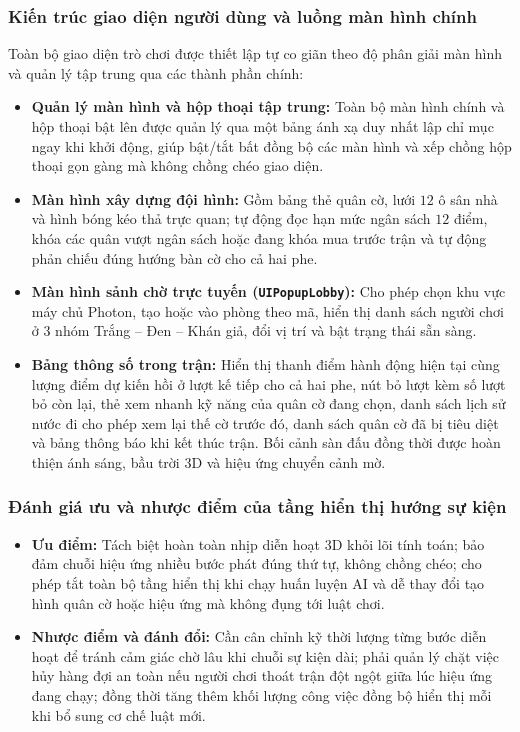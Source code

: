 \subsubsection{Kiến trúc giao diện người dùng và luồng màn hình chính}
Toàn bộ giao diện trò chơi được thiết lập tự co giãn theo độ phân giải màn hình và quản lý tập trung qua các thành phần chính:
\begin{itemize}
    \item \textbf{Quản lý màn hình và hộp thoại tập trung:} Toàn bộ màn hình chính và hộp thoại bật lên được quản lý qua một bảng ánh xạ duy nhất lập chỉ mục ngay khi khởi động, giúp bật/tắt bất đồng bộ các màn hình và xếp chồng hộp thoại gọn gàng mà không chồng chéo giao diện.
    \item \textbf{Màn hình xây dựng đội hình:} Gồm bảng thẻ quân cờ, lưới $12$ ô sân nhà và hình bóng kéo thả trực quan; tự động đọc hạn mức ngân sách $12$ điểm, khóa các quân vượt ngân sách hoặc đang khóa mua trước trận và tự động phản chiếu đúng hướng bàn cờ cho cả hai phe.
    \item \textbf{Màn hình sảnh chờ trực tuyến (\texttt{UIPopupLobby}):} Cho phép chọn khu vực máy chủ Photon, tạo hoặc vào phòng theo mã, hiển thị danh sách người chơi ở 3 nhóm Trắng -- Đen -- Khán giả, đổi vị trí và bật trạng thái sẵn sàng.
    \item \textbf{Bảng thông số trong trận:} Hiển thị thanh điểm hành động hiện tại cùng lượng điểm dự kiến hồi ở lượt kế tiếp cho cả hai phe, nút bỏ lượt kèm số lượt bỏ còn lại, thẻ xem nhanh kỹ năng của quân cờ đang chọn, danh sách lịch sử nước đi cho phép xem lại thế cờ trước đó, danh sách quân cờ đã bị tiêu diệt và bảng thông báo khi kết thúc trận. Bối cảnh sàn đấu đồng thời được hoàn thiện ánh sáng, bầu trời 3D và hiệu ứng chuyển cảnh mờ.
\end{itemize}

\subsubsection{Đánh giá ưu và nhược điểm của tầng hiển thị hướng sự kiện}
\begin{itemize}
    \item \textbf{Ưu điểm:} Tách biệt hoàn toàn nhịp diễn hoạt 3D khỏi lõi tính toán; bảo đảm chuỗi hiệu ứng nhiều bước phát đúng thứ tự, không chồng chéo; cho phép tắt toàn bộ tầng hiển thị khi chạy huấn luyện AI và dễ thay đổi tạo hình quân cờ hoặc hiệu ứng mà không đụng tới luật chơi.
    \item \textbf{Nhược điểm và đánh đổi:} Cần cân chỉnh kỹ thời lượng từng bước diễn hoạt để tránh cảm giác chờ lâu khi chuỗi sự kiện dài; phải quản lý chặt việc hủy hàng đợi an toàn nếu người chơi thoát trận đột ngột giữa lúc hiệu ứng đang chạy; đồng thời tăng thêm khối lượng công việc đồng bộ hiển thị mỗi khi bổ sung cơ chế luật mới.
\end{itemize}
